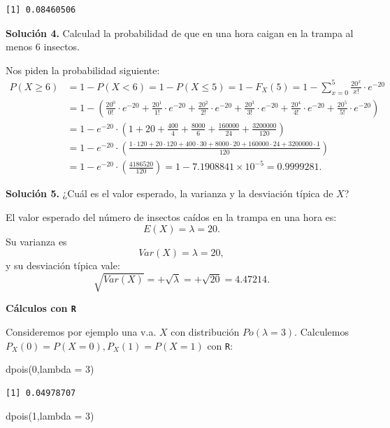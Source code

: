 \documentclass[
  letterpaper,
  DIV=11,
  numbers=noendperiod]{scrreprt}
\newenvironment{Shaded}{\begin{snugshade}}{\end{snugshade}}
\newcommand{\AttributeTok}[1]{\textcolor[rgb]{0.40,0.45,0.13}{#1}}
\newcommand{\DecValTok}[1]{\textcolor[rgb]{0.68,0.00,0.00}{#1}}
\newcommand{\FunctionTok}[1]{\textcolor[rgb]{0.28,0.35,0.67}{#1}}
\newcommand{\NormalTok}[1]{\textcolor[rgb]{0.00,0.23,0.31}{#1}}
\begin{document}
\begin{verbatim}
[1] 0.08460506
\end{verbatim}

\textbf{Solución 4.} Calculad la probabilidad de que en una hora caigan
en la trampa al menos 6 insectos.

Nos piden la probabilidad siguiente: \[
\begin{array}{rl}
 P(X\geq 6)&=1- P(X<6)=1-P(X\leq 5)=1-F_X(5)=1-\displaystyle\sum_{x=0}^{5} \frac{20^{x}}{x!}\cdot e^{-20}\\
 &=
 1-\left(\frac{20^{0}}{0!}\cdot e^{-20}+\frac{20^{1}}{1!}\cdot e^{-20}+\frac{20^{2}}{2!}\cdot e^{-20}+\frac{20^{3}}{3!}\cdot e^{-20}+\frac{20^{4}}{4!}\cdot e^{-20}+\frac{20^{5}}{5!}\cdot e^{-20}\right)\\[1ex]
 &=
 1-e^{-20}\cdot \left(1+20+\frac{400}{4}+\frac{8000}{6}+\frac{160000}{24}+\frac{3200000}{120}\right)\\[1ex]
 &=
 1-e^{-20} \cdot \left(\frac{1 \cdot 120+20\cdot 120+400\cdot 30+8000\cdot 20+160000\cdot 24+3200000\cdot 1}{120}\right)\\[1ex]
 &= 1-e^{-20}\cdot\left(\frac{4186520}{120}\right)=1-\ensuremath{7.1908841\times 10^{-5}} =0.9999281.
\end{array}
\]

\textbf{Solución 5.} ¿Cuál es el valor esperado, la varianza y la
desviación típica de \(X\)?

El valor esperado del número de insectos caídos en la trampa en una hora
es: \[E(X)=\lambda=20.\] Su varianza es \[Var(X)=\lambda=20,\] y su
desviación típica vale:
\[\sqrt{Var(X)}=+\sqrt{\lambda}=+\sqrt{20}=4.47214.\]

\textbf{Cálculos con \texttt{R}}

Consideremos por ejemplo una v.a. \(X\) con distribución
\(Po(\lambda=3)\). Calculemos \(P_X(0)=P(X=0), P_X(1)=P(X=1)\) con
\texttt{R}:

\begin{Shaded}
\begin{Highlighting}[]
\FunctionTok{dpois}\NormalTok{(}\DecValTok{0}\NormalTok{,}\AttributeTok{lambda =} \DecValTok{3}\NormalTok{)}
\end{Highlighting}
\end{Shaded}

\begin{verbatim}
[1] 0.04978707
\end{verbatim}

\begin{Shaded}
\begin{Highlighting}[]
\FunctionTok{dpois}\NormalTok{(}\DecValTok{1}\NormalTok{,}\AttributeTok{lambda =} \DecValTok{3}\NormalTok{)}
\end{Highlighting}
\end{Shaded}
\end{document}
